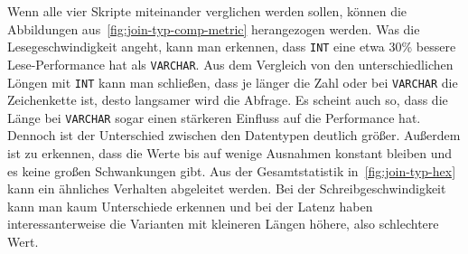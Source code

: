 Wenn alle vier Skripte miteinander verglichen werden sollen, können die Abbildungen aus~\ref{fig:join-typ-comp-metric} herangezogen werden.
Was die Lesegeschwindigkeit angeht, kann man erkennen, dass \texttt{INT} eine etwa 30\% bessere Lese-Performance hat als \texttt{VARCHAR}.
Aus dem Vergleich von den unterschiedlichen Löngen mit \texttt{INT} kann man schließen, dass je länger die Zahl oder bei \texttt{VARCHAR} die Zeichenkette ist, desto langsamer wird die Abfrage.
Es scheint auch so, dass die Länge bei \texttt{VARCHAR} sogar einen stärkeren Einfluss auf die Performance hat.
Dennoch ist der Unterschied zwischen den Datentypen deutlich größer.
Außerdem ist zu erkennen, dass die Werte bis auf wenige Ausnahmen konstant bleiben und es keine großen Schwankungen gibt.
Aus der Gesamtstatistik in~\ref{fig:join-typ-hex} kann ein ähnliches Verhalten abgeleitet werden.
Bei der Schreibgeschwindigkeit kann man kaum Unterschiede erkennen und bei der Latenz haben interessanterweise die Varianten mit kleineren Längen höhere, also schlechtere Wert.


